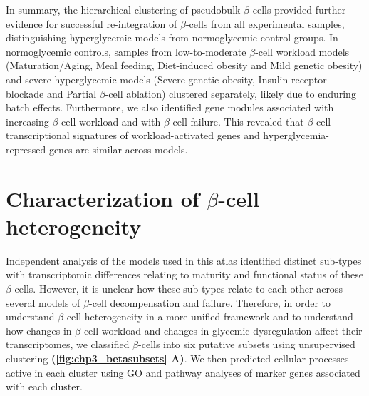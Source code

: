 
\par In summary, the hierarchical clustering of pseudobulk $\beta$-cells provided further evidence for successful re-integration of $\beta$-cells from all experimental samples, distinguishing hyperglycemic models from normoglycemic control groups. In normoglycemic controls, samples from low-to-moderate $\beta$-cell workload models (Maturation/Aging, Meal feeding, Diet-induced obesity and Mild genetic obesity) and severe hyperglycemic models (Severe genetic obesity, Insulin receptor blockade and Partial $\beta$-cell ablation) clustered separately, likely due to enduring batch effects. Furthermore, we also identified gene modules associated with increasing $\beta$-cell workload and with $\beta$-cell failure. This revealed that $\beta$-cell transcriptional signatures of workload-activated genes and hyperglycemia-repressed genes are similar across models.



\section[Characterization of $\beta$-cell heterogeneity]{Characterization of $\beta$-cell heterogeneity}
\label{sec:chp3_betaclustering}

\par Independent analysis of the models used in this atlas identified distinct sub-types with transcriptomic differences relating to maturity and functional status of these $\beta$-cells. However, it is unclear how these sub-types relate to each other across several models of $\beta$-cell decompensation and failure. Therefore, in order to understand $\beta$-cell heterogeneity in a more unified framework and to understand how changes in $\beta$-cell workload and changes in glycemic dysregulation affect their transcriptomes, we classified $\beta$-cells into six putative subsets using unsupervised clustering \textbf{(\autoref{fig:chp3_betasubsets} A)}. We then predicted cellular processes active in each cluster using GO and pathway analyses of marker genes associated with each cluster.


